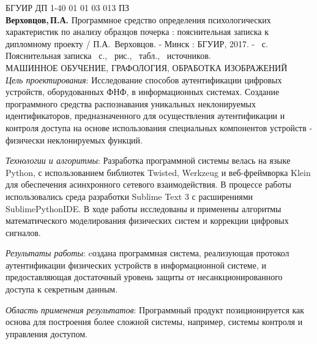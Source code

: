 \thispagestyle{empty}
\noindent БГУИР ДП 1-40 01 01 03 013 ПЗ
\\

\textbf{Верховцов,\,П.А.} Программное средство определения психологических характеристик по анализу образцов почерка : пояснительная записка к дипломному проекту / П.А.~Верховцов. - Минск : БГУИР, 2017. - \pageref*{LastPage}~с.
\\

Пояснительная записка \pageref*{LastPage}~с., \totfig{}~рис., \tottab{}~табл., \totref{}~источников.
\\

\MakeUppercase{машинное обучение, графология, обработка изображений}
\\

\emph{Цель проектирования}: Исследование способов аутентификации цифровых устройств, оборудованных ФНФ, в информационных системах. Создание программного средства распознавания уникальных неклонируемых идентификаторов, предназначенного для осуществления аутентификации и контроля доступа на основе использования специальных компонентов устройств - физически неклонируемых функций.

\emph{Технологии и алгоритмы}: Разработка программной системы велась на языке Python, с использованием библиотек Twisted, Werkzeug и веб-фреймворка Klein для обеспечения асинхронного сетевого взаимодействия. В процессе работы использовались среда разработки Sublime Text 3 с расширениями SublimePythonIDE. В ходе работы исследованы и применены алгоритмы математического моделирования физических систем и коррекции цифровых сигналов.

\emph{Результаты работы}: cоздана программная система, реализующая протокол аутентификации физических устройств в информационной системе, и предоставляющая достаточный уровень защиты от несанкционированного доступа к секретным данным.

\emph{Область применения результатов}: Программный продукт позиционируется как основа для построения более сложной системы, например, системы контроля и управления доступом.


\clearpage
